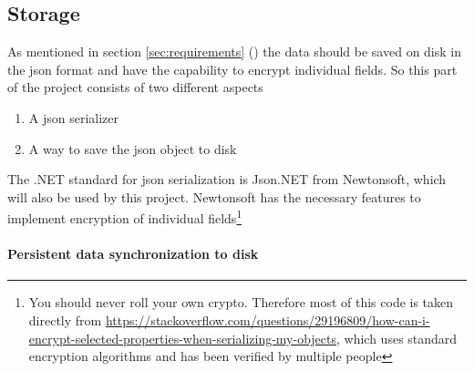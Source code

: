 \documentclass{article}
\begin{document}
\subsection{Storage}
As mentioned in section \ref{sec:requirements} () the data should be saved on disk in the \gls{json} format and have the capability to encrypt individual fields. So this part of the project consists of two different aspects
\begin{enumerate}
    \item A \gls{json} serializer
    \item A way to save the \gls{json} object to disk
\end{enumerate}
The .NET standard for \gls{json} serialization is Json.NET from Newtonsoft\cite{url:considerations:newtonsoft}, which will also be used by this project. Newtonsoft has the necessary features to implement encryption of individual fields\footnote{You should never roll your own crypto. Therefore most of this code is taken directly from \url{https://stackoverflow.com/questions/29196809/how-can-i-encrypt-selected-properties-when-serializing-my-objects}, which uses standard encryption algorithms and has been verified by multiple people}
\\
\paragraph{Persistent data synchronization to disk}
\end{document}
